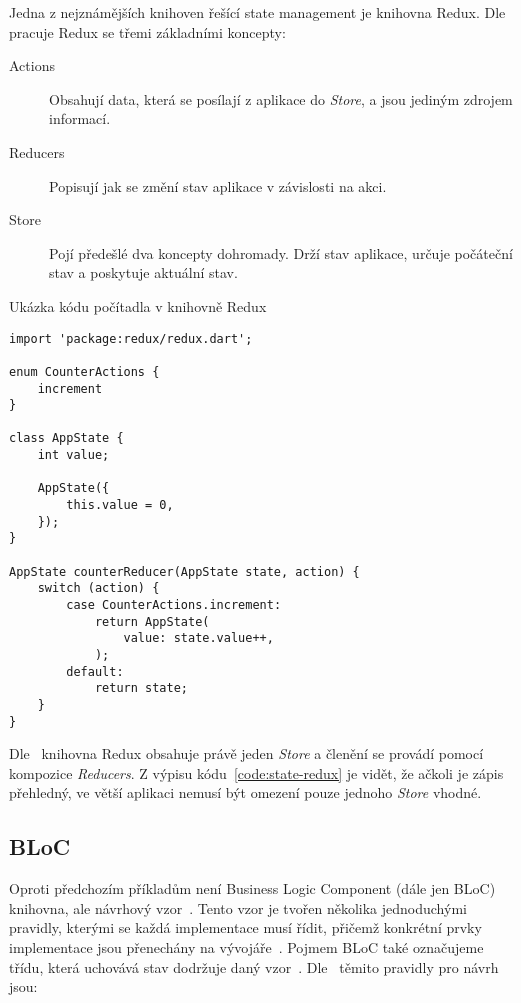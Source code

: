 Jedna z nejznámějších knihoven řešící state management je knihovna Redux.
Dle~\cite{redux_basics} pracuje Redux se třemi základními koncepty:

\begin{description}
    \item[Actions] Obsahují data,
    která se posílají z aplikace do \emph{Store},
    a jsou jediným zdrojem informací.
    \item[Reducers] Popisují jak se změní stav aplikace v závislosti na akci.
    \item[Store] Pojí předešlé dva koncepty dohromady.
    Drží stav aplikace,
    určuje počáteční stav
    a poskytuje aktuální stav.
\end{description}

\begin{listing}
    \caption{Ukázka kódu počítadla v knihovně Redux~\cite{redux_basics}}
    \label{code:state-redux}
    \begin{verbatim}
import 'package:redux/redux.dart';

enum CounterActions {
    increment
}

class AppState {
    int value;

    AppState({ 
        this.value = 0,
    });
}

AppState counterReducer(AppState state, action) {
    switch (action) {
        case CounterActions.increment:
            return AppState(
                value: state.value++,
            );
        default:
            return state;
    }
}
    \end{verbatim}
\end{listing}

Dle~\cite{redux_basics} knihovna Redux obsahuje právě jeden \emph{Store}
a členění se provádí pomocí kompozice \emph{Reducers}.
Z výpisu kódu~\ref{code:state-redux} je vidět,
že ačkoli je zápis přehledný,
ve větší aplikaci nemusí být omezení pouze jednoho \emph{Store} vhodné.

\subsection{BLoC}

Oproti předchozím příkladům není Business Logic Component (dále jen BLoC)
knihovna,
ale návrhový vzor~\cite{googledevelopers_bloc}.
Tento vzor je tvořen několika jednoduchými pravidly,
kterými se každá implementace musí řídit,
přičemž konkrétní prvky implementace jsou přenechány na
vývojáře~\cite{googledevelopers_bloc}.
Pojmem BLoC také označujeme třídu,
která uchovává stav dodržuje daný vzor~\cite{googledevelopers_bloc}. 
Dle~\cite{googledevelopers_bloc} těmito pravidly pro návrh jsou:

